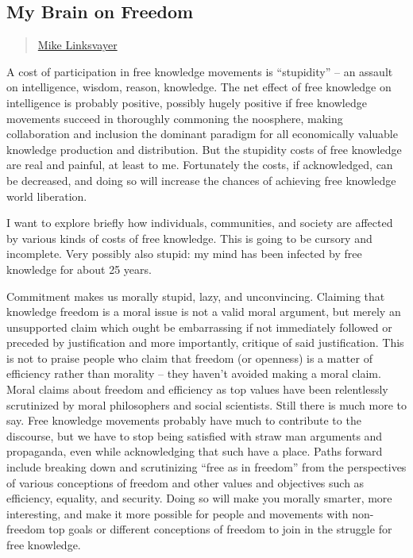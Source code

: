 \subsection{My Brain on Freedom}\label{my-brain-on-freedom}

\begin{quote}
\hyperlink{mike-linksvayer}{Mike Linksvayer}
\end{quote}

A cost of participation in free knowledge movements is ``stupidity'' --
an assault on intelligence, wisdom, reason, knowledge. The net effect of
free knowledge on intelligence is probably positive, possibly hugely
positive if free knowledge movements succeed in thoroughly commoning the
noosphere, making collaboration and inclusion the dominant paradigm for
all economically valuable knowledge production and distribution. But the
stupidity costs of free knowledge are real and painful, at least to me.
Fortunately the costs, if acknowledged, can be decreased, and doing so
will increase the chances of achieving free knowledge world liberation.

I want to explore briefly how individuals, communities, and society are
affected by various kinds of costs of free knowledge. This is going to
be cursory and incomplete. Very possibly also stupid: my mind has been
infected by free knowledge for about 25 years.

Commitment makes us morally stupid, lazy, and unconvincing. Claiming
that knowledge freedom is a moral issue is not a valid moral argument,
but merely an unsupported claim which ought be embarrassing if not
immediately followed or preceded by justification and more importantly,
critique of said justification. This is not to praise people who claim
that freedom (or openness) is a matter of efficiency rather than
morality -- they haven't avoided making a moral claim. Moral claims
about freedom and efficiency as top values have been relentlessly
scrutinized by moral philosophers and social scientists. Still there is
much more to say. Free knowledge movements probably have much to
contribute to the discourse, but we have to stop being satisfied with
straw man arguments and propaganda, even while acknowledging that such
have a place. Paths forward include breaking down and scrutinizing
``free as in freedom'' from the perspectives of various conceptions of
freedom and other values and objectives such as efficiency, equality,
and security. Doing so will make you morally smarter, more interesting,
and make it more possible for people and movements with non-freedom top
goals or different conceptions of freedom to join in the struggle for
free knowledge.

